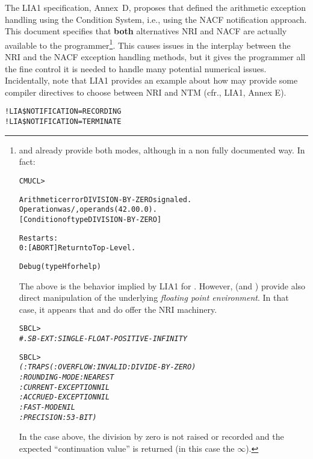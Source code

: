 \documentclass[../Description.tex]{subfiles}
\begin{document}
The LIA1 specification, Annex~D, proposes that \CL{} defined the
arithmetic exception handling using the Condition System, i.e., using
the NACF notification approach.  This document specifies that
\textbf{both} alternatives NRI and NACF are actually available to the
programmer\footnote{\CMUCL{} and \SBCL{} already provide
  both modes, although in a non fully documented way. In fact:

\begin{alltt}
CMUCL> 

Arithmetic error DIVISION-BY-ZERO signaled.
Operation was /, operands (42.0 0.0).
   [Condition of type DIVISION-BY-ZERO]

Restarts:
  0: [ABORT] Return to Top-Level.

Debug  (type H for help)
\end{alltt}
  The above is the behavior implied by LIA1 for \CL{}.  However,
  \CMUCL{} (and \SBCL{}) provide also direct manipulation of the
  underlying \emph{floating point environment}.  In that case, it
  appears that \CMUCL{} and \SBCL{} do offer the NRI machinery.
\begin{alltt}
SBCL> 
\textit{\#.SB-EXT:SINGLE-FLOAT-POSITIVE-INFINITY}

SBCL> \\
\textit{(:TRAPS (:OVERFLOW :INVALID :DIVIDE-BY-ZERO)\\
  :ROUNDING-MODE :NEAREST\\
  :CURRENT-EXCEPTION NIL\\
  :ACCRUED-EXCEPTION NIL\\
  :FAST-MODE NIL\\
  :PRECISION :53-BIT)}
\end{alltt}
In the case above, the division by zero is not raised or recorded and
the expected ``continuation value'' is returned (in this case the
 $\infty$).
}.
This causes issues in the interplay between the NRI and the NACF
exception handling methods, but it gives the programmer all the fine
control it is needed to handle many potential numerical
issues. Incidentally, note that LIA1 provides an example about how
\Fortran{} may provide some compiler directives to choose between NRI
and NTM (cfr., LIA1, Annex E).
\begin{alltt}
!LIA\$  NOTIFICATION=RECORDING
!LIA\$  NOTIFICATION=TERMINATE
\end{alltt}
\end{document}
